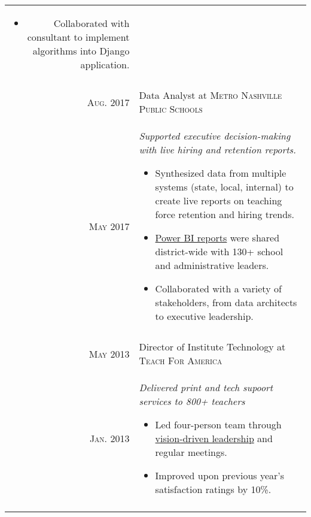 \documentclass[a4paper,10pt]{article}
\begin{document}
\begin{longtable}{r|p{11cm}}
{\begin{itemize}[itemsep=1pt,topsep=2pt]
	    \item Collaborated with consultant to implement algorithms into Django application. 
    \end{itemize}}\\
 	\multicolumn{2}{c}{} \\

    \textsc{Aug.} 2017 & Data Analyst at \textsc{Metro Nashville Public Schools} \\
    \textsc{May} 2017 & \emph{Supported executive decision-making with live hiring and retention reports.}
    \footnotesize{
    \begin{itemize}[itemsep=1pt,topsep=2pt]
        \item Synthesized data from multiple systems (state, local, internal) to create live reports on teaching force retention and hiring trends. 
        \item \href{...}{Power BI reports} were shared district-wide with 130+ school and administrative leaders. 
        \item Collaborated with a variety of stakeholders, from data architects to executive leadership.
    \end{itemize}}\\
    \multicolumn{2}{c}{}\\

    \textsc{May} 2013 & Director of Institute Technology at \textsc{Teach For America} \\
    \textsc{Jan.} 2013 & \emph{Delivered print and tech supoort services to 800+ teachers}
    \footnotesize{
    \begin{itemize}[itemsep=1pt,topsep=2pt]
        \item Led four-person team through \href{...}{vision-driven leadership} and regular meetings. 
        \item Improved upon previous year's satisfaction ratings by 10\%. 
    \end{itemize}}\\
    \multicolumn{2}{c}{} \\


\end{longtable}
\end{document}
